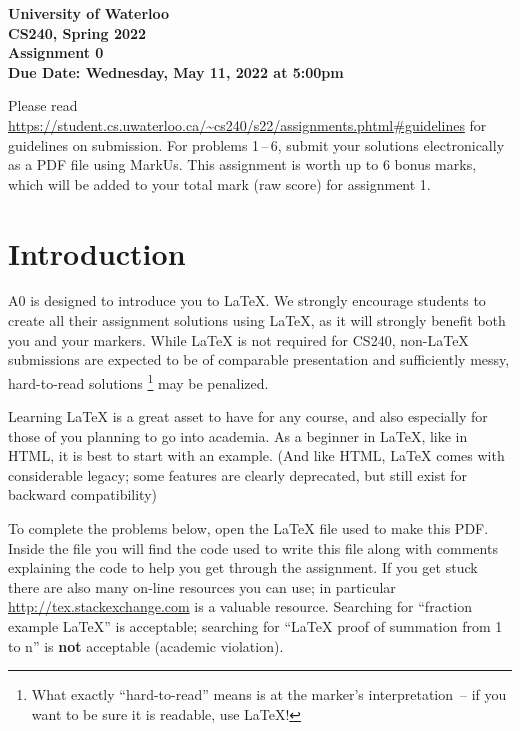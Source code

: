 \documentclass[12pt]{article}
\begin{document}
\begin{center}
{\Large\textbf{University of Waterloo}}\\
\vspace{3mm}
{\Large\textbf{CS240, Spring 2022}}\\
\vspace{2mm}
{\Large\textbf{Assignment 0}}\\
\vspace{3mm}
\textbf{Due Date: Wednesday, May 11, 2022 at 5:00pm}
\end{center}

Please read
\url{https://student.cs.uwaterloo.ca/~cs240/s22/assignments.phtml#guidelines}
for guidelines on submission.  For problems 1\,--\,6, submit your
solutions electronically as a PDF file using MarkUs.
This assignment is worth up to 6 bonus marks, which will be added to
your total mark (raw score) for assignment 1.


\section*{Introduction}

A0 is designed to introduce you to \LaTeX.
We strongly encourage students to create all their assignment solutions using \LaTeX,
as it will strongly benefit both you and your markers. While \LaTeX{} is not required for CS240,
non-\LaTeX{} submissions are expected to be of comparable presentation and sufficiently
messy, hard-to-read solutions%
\footnote{%
	What exactly ``hard-to-read'' means is at the marker's interpretation~-- 
	if you want to be sure it is readable, use \LaTeX!%
} 
may be penalized. 


Learning \LaTeX{} is a great asset 
to have for any course, and also especially for those of you planning to go into academia.
As a beginner in \LaTeX, like in HTML, it is best to start with an example. 
(And like HTML, \LaTeX{} comes with considerable legacy; some features are clearly deprecated,
but still exist for backward compatibility)

To complete the problems below, open the 
\LaTeX{} file used to make this PDF. Inside the file you will find the code used to write this
file along with comments explaining the code to help you get through the assignment. If you get
stuck there are also many on-line resources you can use;
in particular \url{http://tex.stackexchange.com} is a valuable resource.
Searching for ``fraction example \LaTeX'' 
is acceptable; searching for ``\LaTeX{} proof of summation from 1 to n'' 
is \textbf{not} acceptable (academic violation). 
\end{document}
